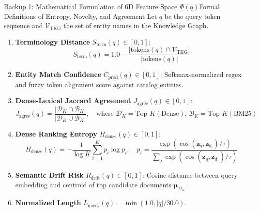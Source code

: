 \documentclass[aspectratio=169,10pt]{beamer}
\begin{document}
\begin{frame}{Backup 1: Mathematical Formulation of 6D Feature Space $\Phi(q)$}{Formal Definitions of Entropy, Novelty, and Agreement}
  \scriptsize
  Let $q$ be the query token sequence and $\mathcal{V}_{\text{TKG}}$ the set of entity names in the Knowledge Graph.
  \begin{enumerate}\setlength\itemsep{0.03ex}
    \item \textbf{Terminology Distance} $S_{\text{term}}(q) \in [0, 1]$:
    \begin{equation*}
      S_{\text{term}}(q) = 1.0 - \frac{|\text{tokens}(q) \cap \mathcal{V}_{\text{TKG}}|}{|\text{tokens}(q)|}
    \end{equation*}
    \item \textbf{Entity Match Confidence} $C_{\text{prod}}(q) \in [0, 1]$: Softmax-normalized regex and fuzzy token alignment score against catalog entities.
    \item \textbf{Dense-Lexical Jaccard Agreement} $J_{\text{agree}}(q) \in [0, 1]$:
    \begin{equation*}
      J_{\text{agree}}(q) = \frac{|\mathcal{D}_K \cap \mathcal{B}_K|}{|\mathcal{D}_K \cup \mathcal{B}_K|}, \quad \text{where } \mathcal{D}_K = \text{Top-}K(\text{Dense}),\, \mathcal{B}_K = \text{Top-}K(\text{BM25})
    \end{equation*}
    \item \textbf{Dense Ranking Entropy} $H_{\text{dense}}(q) \in [0, 1]$:
    \begin{equation*}
      H_{\text{dense}}(q) = -\frac{1}{\log K} \sum_{i=1}^K p_i \log p_i, \quad p_i = \frac{\exp(\cos(\mathbf{z}_q, \mathbf{z}_{d_i})/\tau)}{\sum_j \exp(\cos(\mathbf{z}_q, \mathbf{z}_{d_j})/\tau)}
    \end{equation*}
    \item \textbf{Semantic Drift Risk} $R_{\text{drift}}(q) \in [0, 1]$: Cosine distance between query embedding and centroid of top candidate documents $\bm{\mu}_{\mathcal{D}_K}$.
    \item \textbf{Normalized Length} $L_{\text{query}}(q) = \min(1.0, |q| / 30.0)$.
  \end{enumerate}
\end{frame}
\end{document}
